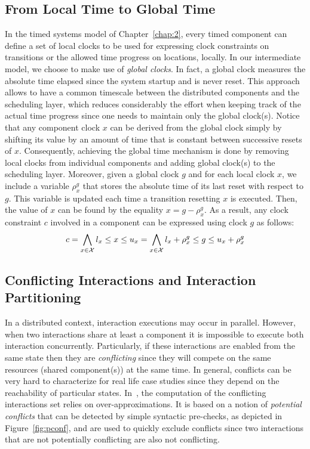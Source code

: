 \subsection{From Local Time to Global Time}
In the timed systems model of Chapter~\ref{chap:2}, every timed component can define a set of 
local clocks to be used for expressing clock constraints on transitions or the allowed time 
progress on locations, locally. In our intermediate model, we choose to make use of \emph{global 
clocks}.
In fact, a global clock measures the absolute time elapsed since the system startup and is never
reset. This approach allows to have a common timescale between the distributed components
and the scheduling layer, which reduces considerably the effort when keeping track of the
actual time progress since one needs to maintain only the global clock(s). 
Notice that any component clock $x$ can be derived from the global clock simply by shifting its 
value by an amount of time that is constant between successive resets of $x$. 
Consequently, achieving 
the global time mechanism is done by removing local clocks from individual components 
and adding global clock(s) to the scheduling layer. Moreover, given a global clock $g$ 
and for each local clock $x$,
we include a variable $\rho_x^g$ that stores the absolute time of its last reset with respect
to $g$. This variable is updated each time a transition resetting $x$ 
is executed. Then, the value of $x$ can be found by the equality $x=g-\rho_x^g$.  
As a result, any clock constraint $c$ involved in a component can be expressed using clock $g$
as follows:
\begin{equation}\label{eq:g_clk}
  c=\bigwedge_{x\in\mathcal{X}} l_x\le x\le u_x=\bigwedge_{x\in\mathcal{X}}l_x+\rho_x^g\le g\le u_x+\rho_x^g
\end{equation}

\subsection{Conflicting Interactions and Interaction Partitioning}
\label{sub:conf}
In a distributed context, interaction executions may occur in parallel. However,
when two interactions share at least a component it is impossible to execute both
interaction concurrently. Particularly, if these interactions are enabled from the same state 
then they are \emph{conflicting} since they will compete on the same resources (shared 
component(s)) at the same time.
In general, conflicts can be very hard to characterize for real life case studies since 
they depend on the reachability of particular states. In~\cite{ahlem_these,conf_free}, 
the computation of
the conflicting interactions set relies on over-approximations. It is based on a notion 
of \emph{potential conflicts} that can be detected by simple syntactic pre-checks, as depicted
in Figure~\ref{fig:pconf}, and are used to quickly exclude conflicts since two interactions
that are not potentially conflicting are also not conflicting. 

